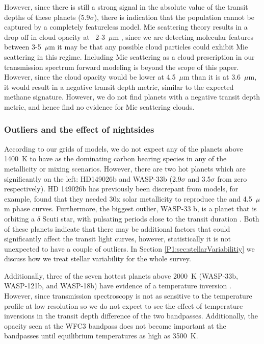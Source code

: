 However, since there is still a strong signal in the absolute value of the transit depths of these planets (5.9$\sigma$), there is indication that the population cannot be captured by a completely featureless model. Mie scattering theory results in a drop off in cloud opacity at ~2-3~$\mu$m \citep[e.g.,][]{Benneke2019}, since we are detecting molecular features between 3-5~$\mu$m it may be that any possible cloud particles could exhibit Mie scattering in this regime. Including Mie scattering as a cloud prescription in our transmission spectrum forward modeling is beyond the scope of this paper. However, since the cloud opacity would be lower at 4.5~$\mu$m than it is at 3.6~$\mu$m, it would result in a negative transit depth metric, similar to the expected methane signature. However, we do not find planets with a negative transit depth metric, and hence find no evidence for Mie scattering clouds.


\subsubsection{Outliers and the effect of nightsides}
\label{P1:subsec:additionaleffects}

According to our grids of models, we do not expect any of the planets above 1400~K to have  as the dominating carbon bearing species in any of the metallicity or mixing scenarios. However, there are two hot planets which are significantly on the left: HD149026b and WASP-33b (2.9$\sigma$ and 3.5$\sigma$ from zero respectively). HD 149026b has previously been discrepant from models, for example, \citet{Zhang2018a} found that they needed 30x solar metallicity to reproduce the  and 4.5~$\mu$m phase curves. Furthermore, the biggest outlier, WASP-33 b, is a planet that is orbiting a $\delta$ Scuti star, with pulsating periods close to the transit duration \citep{Herrero2011}. Both of these planets indicate that there may be additional factors that could significantly affect the transit light curves, however, statistically it is not unexpected to have a couple of outliers. In Section \ref{P1:sec:stellarVariabilitiy} we discuss how we treat stellar variability for the whole survey.

Additionally, three of the seven hottest planets above 2000~K (WASP-33b, WASP-121b, and WASP-18b) have evidence of a temperature inversion \citep{vonEssen2015, Haynes2015, Evans2017, Arcangeli2018}. However, since transmission spectroscopy is not as sensitive to the temperature profile at low resolution \citep[e.g.,][]{Brown2001} so we do not expect to see the effect of temperature inversions in the transit depth difference of the two \spitzerIRAC bandpasses. Additionally, the  opacity seen at the WFC3 bandpass \citep[e.g.][]{Arcangeli2018} does not become important at the \spitzerIRAC bandpasses until equilibrium temperatures as high as 3500~K.

